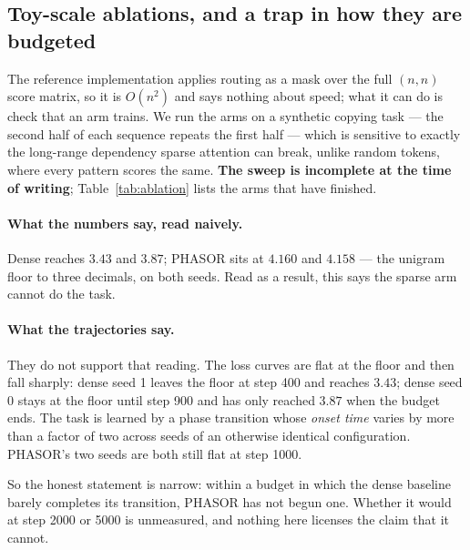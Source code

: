\subsection{Toy-scale ablations, and a trap in how they are budgeted}
\label{sec:toy}

The reference implementation applies routing as a mask over the full $(n,n)$ score matrix, so it is $O(n^2)$ and says nothing about speed; what it can do is check that an arm trains. We run the arms on a synthetic copying task --- the second half of each sequence repeats the first half --- which is sensitive to exactly the long-range dependency sparse attention can break, unlike random tokens, where every pattern scores the same. \textbf{The sweep is incomplete at the time of writing}; Table~\ref{tab:ablation} lists the arms that have finished.

\begin{table}[h]
\centering
\small

\caption{Toy scale, \textbf{sweep incomplete}: 2 layers, $d = 128$, 4 heads, context 256, vocabulary 64, 1000 steps, two seeds reported separately. These runs cannot support a claim about language modelling. The unigram floor is $\log 64 = 4.159$; PHASOR's density is $8.6\%$ at window 8.}
\label{tab:ablation}
\end{table}

\paragraph{What the numbers say, read naively.} Dense reaches $3.43$ and $3.87$; PHASOR sits at $4.160$ and $4.158$ --- the unigram floor to three decimals, on both seeds. Read as a result, this says the sparse arm cannot do the task.

\paragraph{What the trajectories say.} They do not support that reading. The loss curves are flat at the floor and then fall sharply: dense seed 1 leaves the floor at step 400 and reaches $3.43$; dense seed 0 stays at the floor until step 900 and has only reached $3.87$ when the budget ends. The task is learned by a phase transition whose \emph{onset time} varies by more than a factor of two across seeds of an otherwise identical configuration. PHASOR's two seeds are both still flat at step 1000.

So the honest statement is narrow: within a budget in which the dense baseline barely completes its transition, PHASOR has not begun one. Whether it would at step 2000 or 5000 is unmeasured, and nothing here licenses the claim that it cannot.

